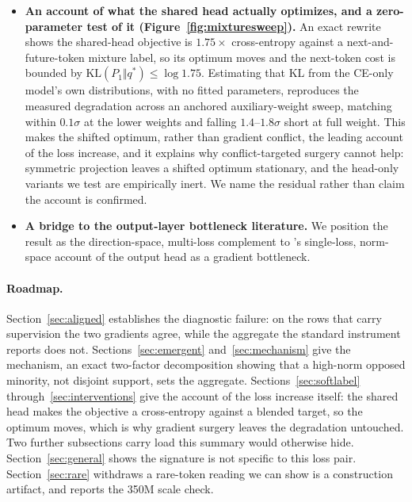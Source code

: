 \begin{itemize}
  damage worse; and the standard capacity-separated auxiliary reduces but does not eliminate
  the gap (the standard variant demonstrably so; the tuned variant inconclusive), each reported with
  its statistical test and caveats.
\item \textbf{An account of what the shared head actually optimizes, and a
  zero-parameter test of it (Figure~\ref{fig:mixturesweep}).} An exact rewrite shows
  the shared-head objective is $1.75\times$ cross-entropy against a next-and-future-token
  mixture label, so its optimum moves and the next-token cost is bounded by
  $\mathrm{KL}(P_1 \Vert q^{*}) \leq \log 1.75$. Estimating that KL from the CE-only
  model's own distributions, with no fitted parameters, reproduces the measured
  degradation across an anchored auxiliary-weight sweep, matching within
  $0.1\sigma$ at the lower weights and falling $1.4$--$1.8\sigma$ short at full
  weight. This makes the shifted optimum, rather than gradient conflict, the leading
  account of the loss increase, and it explains why conflict-targeted surgery cannot
  help: symmetric projection leaves a shifted optimum stationary, and the head-only
  variants we test are empirically inert. We name the residual
  rather than claim the account is confirmed.
\item \textbf{A bridge to the output-layer bottleneck literature.} We position the
  result as the direction-space, multi-loss complement to
  \citet{godey2026lmhead}'s single-loss, norm-space account of the output head as
  a gradient bottleneck.
\end{itemize}

\paragraph{Roadmap.} Section~\ref{sec:aligned} establishes the diagnostic
failure: on the rows that carry supervision the two gradients agree, while the
aggregate the standard instrument reports does not.
Sections~\ref{sec:emergent} and~\ref{sec:mechanism} give the mechanism, an exact
two-factor decomposition showing that a high-norm opposed minority, not disjoint
support, sets the aggregate.
Sections~\ref{sec:softlabel} through~\ref{sec:interventions} give the account of
the loss increase itself: the shared head makes the objective a cross-entropy
against a blended target, so the optimum moves, which is why gradient surgery
leaves the degradation untouched. Two further subsections carry load this summary
would otherwise hide. Section~\ref{sec:general} shows the signature is not specific
to this loss pair. Section~\ref{sec:rare} withdraws a rare-token reading we can show
is a construction artifact, and reports the 350M scale check.


